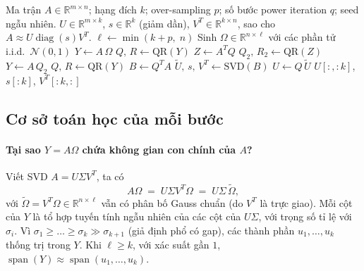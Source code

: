 \begin{algorithm}[ht]
\caption{Randomized SVD (Halko--Martinsson--Tropp 2011)}\label{alg:rsvd}
\begin{algorithmic}[1]
\Require Ma trận $A \in \mathbb{R}^{m\times n}$; hạng đích $k$;
         over-sampling $p$; số bước power iteration $q$; seed ngẫu nhiên.
\Ensure  $U \in \mathbb{R}^{m\times k}$,
         $s \in \mathbb{R}^{k}$ (giảm dần),
         $V^T \in \mathbb{R}^{k\times n}$, sao cho $A \approx U \operatorname{diag}(s) V^T$.
\State $\ell \gets \min(k + p,\; n)$
\State Sinh $\Omega \in \mathbb{R}^{n\times \ell}$ với các phần tử
       i.i.d.\ $\mathcal{N}(0,1)$
\State $Y \gets A\,\Omega$
 
    \State $Q,\, R \gets \text{QR}(Y)$
    \State $Z \gets A^T Q$
    \State $Q_2,\, R_2 \gets \text{QR}(Z)$
    \State $Y \gets A\, Q_2$
\EndFor
\State $Q,\, R \gets \text{QR}(Y)$
\State $B \gets Q^T A$
\State $\widetilde{U},\, s,\, V^T \gets \text{SVD}(B)$
\State $U \gets Q\, \widetilde{U}$
\State \Return $U[:, :k]$, $s[:k]$, $V^T[:k, :]$
\end{algorithmic}
\end{algorithm}

\subsection{Cơ sở toán học của mỗi bước}\label{subsec:rsvd-justify}

\paragraph{Tại sao $Y = A\Omega$ chứa không gian con chính của $A$?}
Viết SVD $A = U\Sigma V^T$, ta có
\[
    A \Omega \;=\; U\Sigma V^T \Omega \;=\; U\Sigma\, \widetilde{\Omega},
\]
với $\widetilde{\Omega} = V^T \Omega \in \mathbb{R}^{n\times \ell}$ vẫn có
phân bố Gauss chuẩn (do $V^T$ là trực giao). Mỗi cột của $Y$ là tổ hợp tuyến
tính ngẫu nhiên của các cột của $U\Sigma$, với trọng số tỉ lệ với $\sigma_i$.
Vì $\sigma_1 \ge \dots \ge \sigma_k \gg \sigma_{k+1}$ (giả định phổ có gap),
các thành phần $u_1, \dots, u_k$ thống trị trong $Y$. Khi $\ell \ge k$, với
xác suất gần $1$, $\operatorname{span}(Y) \approx \operatorname{span}(u_1, \dots, u_k)$.

